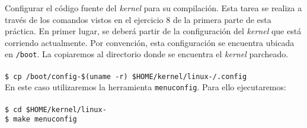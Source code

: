 \begin{questions}

  \question Configurar el código fuente del \textit{kernel} para su
  compilación. Esta tarea se realiza a través de los comandos vistos en el
  ejercicio 8 de la primera parte de esta práctica. En primer lugar, se
  deberá partir de la configuración del \textit{kernel} que está corriendo
  actualmente. Por convención, esta configuración se encuentra ubicada en
  \texttt{/boot}. La copiaremos al directorio donde se encuentra el \textit{kernel}
  parcheado.\\
\texttt{\\
\$ cp /boot/config-\$(uname -r) \$HOME/kernel/linux-\KERNELBASEVERSION/.config} \\

  En este caso utilizaremos la herramienta \texttt{menuconfig}. Para ello
  ejecutaremos:\\
\texttt{\\
\$ cd \$HOME/kernel/linux-\KERNELBASEVERSION \\
\$ make menuconfig} \\


\end{questions}
